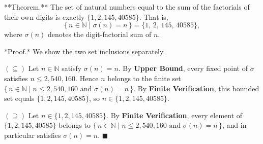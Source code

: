 **Theorem.** The set of natural numbers equal to the sum of the factorials of their own digits is exactly $\{1, 2, 145, 40585\}$. That is,
$$\{\, n \in \mathbb{N} \mid \sigma(n) = n \,\} = \{1,\, 2,\, 145,\, 40585\},$$
where $\sigma(n)$ denotes the digit-factorial sum of $n$.

*Proof.* We show the two set inclusions separately.

$(\subseteq)$ Let $n \in \mathbb{N}$ satisfy $\sigma(n) = n$. By \textbf{Upper Bound}, every fixed point of $\sigma$ satisfies $n \leq 2{,}540{,}160$. Hence $n$ belongs to the finite set $\{\, n \in \mathbb{N} \mid n \leq 2{,}540{,}160 \text{ and } \sigma(n) = n\,\}$. By \textbf{Finite Verification}, this bounded set equals $\{1, 2, 145, 40585\}$, so $n \in \{1, 2, 145, 40585\}$.

$(\supseteq)$ Let $n \in \{1, 2, 145, 40585\}$. By \textbf{Finite Verification}, every element of $\{1, 2, 145, 40585\}$ belongs to $\{\, n \in \mathbb{N} \mid n \leq 2{,}540{,}160 \text{ and } \sigma(n) = n\,\}$, and in particular satisfies $\sigma(n) = n$. $\blacksquare$